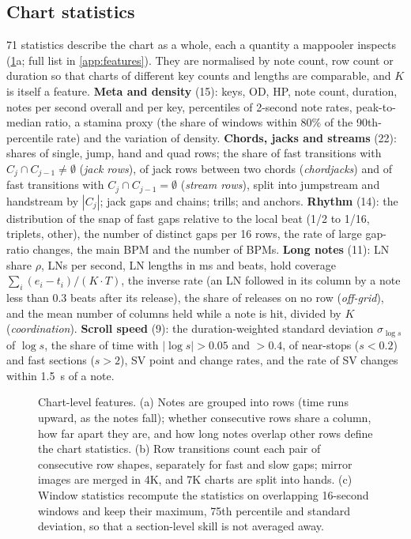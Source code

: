 \documentclass[10pt,twocolumn]{article}
\begin{document}
\subsection{Chart statistics}\label{sec:stats}
71 statistics describe the chart as a whole, each a quantity a mappooler inspects (\cref{fig:features}a; full list in \cref{app:features}). They are normalised by note count, row count or duration so that charts of different key counts and lengths are comparable, and $K$ is itself a feature.
\textbf{Meta and density} (15): keys, OD, HP, note count, duration, notes per second overall and per key, percentiles of 2-second note rates, peak-to-median ratio, a stamina proxy (the share of windows within 80\% of the 90th-percentile rate) and the variation of density.
\textbf{Chords, jacks and streams} (22): shares of single, jump, hand and quad rows; the share of fast transitions with $C_j\cap C_{j-1}\neq\emptyset$ (\emph{jack rows}), of jack rows between two chords (\emph{chordjacks}) and of fast transitions with $C_j\cap C_{j-1}=\emptyset$ (\emph{stream rows}), split into jumpstream and handstream by $|C_j|$; jack gaps and chains; trills; and anchors.
\textbf{Rhythm} (14): the distribution of the snap of fast gaps relative to the local beat (1/2 to 1/16, triplets, other), the number of distinct gaps per 16 rows, the rate of large gap-ratio changes, the main BPM and the number of BPMs.
\textbf{Long notes} (11): LN share $\rho$, LNs per second, LN lengths in ms and beats, hold coverage $\sum_i(e_i-t_i)/(K\cdot T)$, the inverse rate (an LN followed in its column by a note less than 0.3 beats after its release), the share of releases on no row (\emph{off-grid}), and the mean number of columns held while a note is hit, divided by $K$ (\emph{coordination}).
\textbf{Scroll speed} (9): the duration-weighted standard deviation $\sigma_{\log s}$ of $\log s$, the share of time with $|\log s|>0.05$ and $>0.4$, of near-stops ($s<0.2$) and fast sections ($s>2$), SV point and change rates, and the rate of SV changes within \SI{1.5}{s} of a note.

\begin{figure}[t]
\centering
\resizebox{\textwidth}{!}{}
\caption{Chart-level features. (a) Notes are grouped into rows (time runs upward, as the notes fall); whether consecutive rows share a column, how far apart they are, and how long notes overlap other rows define the chart statistics. (b) Row transitions count each pair of consecutive row shapes, separately for fast and slow gaps; mirror images are merged in 4K, and 7K charts are split into hands. (c) Window statistics recompute the statistics on overlapping 16-second windows and keep their maximum, 75th percentile and standard deviation, so that a section-level skill is not averaged away.}
\label{fig:features}
\end{figure}
\end{document}

